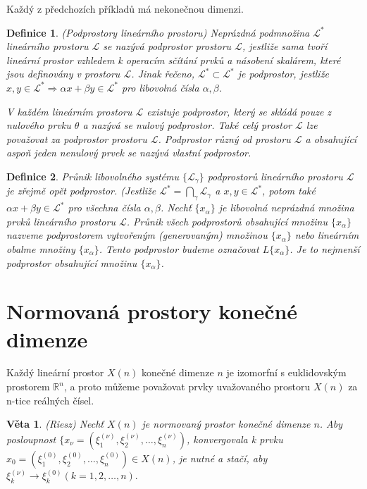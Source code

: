 \documentclass[a4paper, 11pt]{report}
\newtheorem{mydef}{Definice}[chapter]
\newtheorem{veta}{Věta}[chapter]
\begin{document}
Každý z předchozích příkladů má nekonečnou dimenzi.

\begin{mydef}
(Podprostory lineárního prostoru) Neprázdná podmnožina $\mathcal{L}^*$ lineárního prostoru $\mathcal{L}$ se nazývá \emph{podprostor} prostoru $\mathcal{L}$, jestliže sama tvoří lineární prostor vzhledem k operacím sčítání prvků a násobení skalárem, které jsou definovány v prostoru $\mathcal{L}$. Jinak řečeno, $\mathcal{L}^* \subset \mathcal{L}^*$ je podprostor, jestliže
$x,y \in \mathcal{L}^* \Rightarrow \alpha x + \beta y \in \mathcal{L}^*$
pro libovolná čísla $\alpha, \beta$.

V každém lineárním prostoru $\mathcal{L}$ existuje podprostor, který se skládá pouze z nulového prvku $\theta$ a nazývá se \emph{nulový podprostor}. Také celý prostor $\mathcal{L}$ lze považovat za podprostor prostoru $\mathcal{L}$. Podprostor různý od prostoru $\mathcal{L}$ a obsahující aspoň jeden nenulový prvek se nazývá \emph{vlastní podprostor}.
\end{mydef}

\begin{mydef}
Průnik libovolného systému $\{\mathcal{L}_\gamma\}$ podprostorů lineárního prostoru $\mathcal{L}$ je zřejmě opět podprostor.
(Jestliže $\mathcal{L}^* = \bigcap\limits_\gamma \mathcal{L}_\gamma$ a $x, y \in \mathcal{L}^*$, potom také $\alpha x + \beta y \in \mathcal{L}^*$ pro všechna čísla $\alpha, \beta$.
Nechť  $\{x_\alpha\}$ je libovolná neprázdná množina prvků lineárního prostoru $\mathcal{L}$. Průnik všech podprostorů obsahující množinu $\{x_\alpha\}$ nazveme \emph{podprostorem vytvořeným (generovaným) množinou} $\{x_\alpha\}$ nebo \emph{lineárním obalme množiny} $\{x_\alpha\}$. Tento podprostor budeme označovat $L\{x_\alpha\}$. Je to nejmenší podprostor obsahující množinu $\{x_\alpha\}$.
\end{mydef}

\section{Normovaná prostory konečné dimenze}

Každý lineární prostor $X(n)$ konečné dimenze $n$ je izomorfní s euklidovským prostorem $\mathbb{R}^n$, a proto můžeme považovat prvky uvažovaného prostoru $X(n)$ za n-tice reálných čísel.

\begin{veta}
(Riesz) Nechť $X(n)$ je normovaný prostor konečné dimenze $n$. Aby posloupnost
$\{x_\nu = (\xi_1^{(\nu)}, \xi_2^{(\nu)}, \dots, \xi_n^{(\nu)})$,
konvergovala k prvku
$x_0 = (\xi_1^{(0)}, \xi_2^{(0)}, \dots, \xi_n^{(0)}) \in X(n)$, je nutné a stačí, aby
$\xi_k^{(\nu)} \to \xi_k^{(0)} (k = 1, 2, \dots, n).$
\end{veta}
\end{document}
